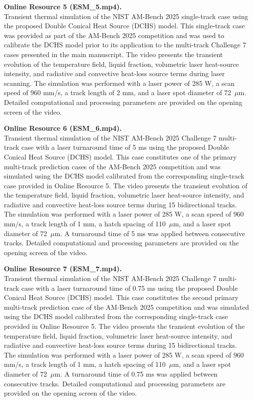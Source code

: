 \documentclass[11pt]{article}
\begin{document}
\medskip

\textbf{Online Resource 5 (ESM\_5.mp4).}\\
Transient thermal simulation of the NIST AM-Bench 2025 single-track
case using the proposed Double Conical Heat Source (DCHS) model.
This single-track case was provided as part of the AM-Bench 2025
competition and was used to calibrate the DCHS model prior to its
application to the multi-track Challenge 7 cases presented in the
main manuscript. The video presents the transient evolution of the
temperature field, liquid fraction, volumetric laser heat-source
intensity, and radiative and convective heat-loss source terms during
laser scanning. The simulation was performed with a laser power of
285 W, a scan speed of 960 mm/s, a track length of 2 mm, and a laser
spot diameter of 72~$\mu$m. Detailed computational and processing
parameters are provided on the opening screen of the video.

\medskip

\textbf{Online Resource 6 (ESM\_6.mp4).}\\
Transient thermal simulation of the NIST AM-Bench 2025 Challenge 7
multi-track case with a laser turnaround time of 5 ms using the proposed
Double Conical Heat Source (DCHS) model. This case constitutes one of
the primary multi-track prediction cases of the AM-Bench 2025 competition
and was simulated using the DCHS model calibrated from the corresponding
single-track case provided in Online Resource 5. The video presents the
transient evolution of the temperature field, liquid fraction, volumetric
laser heat-source intensity, and radiative and convective heat-loss source
terms during 15 bidirectional tracks. The simulation was performed with
a laser power of 285 W, a scan speed of 960 mm/s, a track length of 1 mm,
a hatch spacing of 110~$\mu$m, and a laser spot diameter of 72~$\mu$m.
A turnaround time of 5 ms was applied between consecutive tracks.
Detailed computational and processing parameters are provided on the
opening screen of the video.

\medskip

\textbf{Online Resource 7 (ESM\_7.mp4).}\\
Transient thermal simulation of the NIST AM-Bench 2025 Challenge 7
multi-track case with a laser turnaround time of 0.75 ms using the
proposed Double Conical Heat Source (DCHS) model. This case constitutes
the second primary multi-track prediction case of the AM-Bench 2025
competition and was simulated using the DCHS model calibrated from the
corresponding single-track case provided in Online Resource 5. The video
presents the transient evolution of the temperature field, liquid
fraction, volumetric laser heat-source intensity, and radiative and
convective heat-loss source terms during 15 bidirectional tracks. The
simulation was performed with a laser power of 285 W, a scan speed of
960 mm/s, a track length of 1 mm, a hatch spacing of 110~$\mu$m, and a
laser spot diameter of 72~$\mu$m. A turnaround time of 0.75 ms was
applied between consecutive tracks. Detailed computational and processing
parameters are provided on the opening screen of the video.
\end{document}
